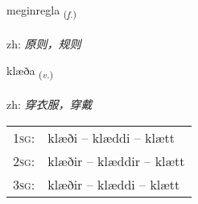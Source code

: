 \documentclass[frontgrid, backgrid]{flacards}\usepackage[]{graphicx}\usepackage[]{color}
\begin{document}
\renewcommand{\flhead}{\vskip5pt \fboxsep=0pt {\small\bfseries\footnotesize Nafnorð | 名词}}
\renewcommand{\fcfoot}{\vskip5pt \fboxsep=0pt \hspace{2pt}{\small\bfseries\footnotesize 2K}}

\renewcommand{\blhead}{\vskip5pt {\small\bfseries\footnotesize Nafnorð | 名词 }}
\renewcommand{\bcfoot}{\vskip5pt \hspace{2pt}{\small\bfseries\footnotesize 2K}}


{meginregla \small{\textsubscript{(\textit{f.})}} \\[1ex] %
\textphonetic{[meijɪnrɛkla]} \\
zh: \emph{原则，规则} \\  [2ex]
\renewcommand*{\arraystretch}{0.8}
}

\renewcommand{\flhead}{\vskip5pt \fboxsep=0pt {\small\bfseries\footnotesize Sagnorð | 动词}}
\renewcommand{\fcfoot}{\vskip5pt \fboxsep=0pt \hspace{2pt}{\small\bfseries\footnotesize 2K}}

\renewcommand{\blhead}{\vskip5pt {\small\bfseries\footnotesize Sagnorð | 动词 }}
\renewcommand{\bcfoot}{\vskip5pt \hspace{2pt}{\small\bfseries\footnotesize 2K}}


{klæða \small{\textsubscript{(\textit{v.})}} \\[1ex] %
\textphonetic{[kʰlaiːða]} \\
zh: \emph{穿衣服，穿戴} \\  [2ex]
\renewcommand*{\arraystretch}{0.8}
\begin{tabular}{p{1cm}l}
\textsc{1sg}: & klæði -- klæddi -- klætt \\ 
\textsc{2sg}: & klæðir -- klæddir -- klætt \\ 
\textsc{3sg}: & klæðir -- klæddi -- klætt \\ 
\end{tabular}
}
\end{document}
